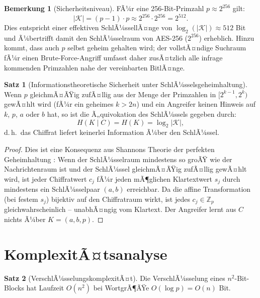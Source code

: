 ﻿\documentclass[a4paper,12pt]{scrreprt}
\theoremstyle{definition}
\newtheorem{bemerkung}{Bemerkung}[section]
\newtheorem{satz}{Satz}[section]
\begin{document}
\begin{bemerkung}[Sicherheitsniveau]
	FÃ¼r eine 256-Bit-Primzahl $p \approx 2^{256}$ gilt:
	\[
	|\mathcal{K}| = (p-1) \cdot p \approx 2^{256} \cdot 2^{256} = 2^{512}.
	\]
	Dies entspricht einer effektiven SchlÃ¼ssellÃ¤nge von $\log_2(|\mathcal{K}|) \approx 512$ Bit und Ã¼bertrifft damit den SchlÃ¼sselraum von AES-256 ($2^{256}$) erheblich. Hinzu kommt, dass auch $p$ selbst geheim gehalten wird; der vollstÃ¤ndige Suchraum fÃ¼r einen Brute-Force-Angriff umfasst daher zusÃ¤tzlich alle infrage kommenden Primzahlen nahe der vereinbarten BitlÃ¤nge.
\end{bemerkung}

\begin{satz}[Informationstheoretische Sicherheit unter SchlÃ¼sselsgeheimhaltung]
	\label{satz:infotheorie}
	Wenn $p$ gleichmÃ¤ÃŸig zufÃ¤llig aus der Menge der Primzahlen in $[2^{k-1}, 2^k)$ gewÃ¤hlt wird (fÃ¼r ein geheimes $k > 2n$) und ein Angreifer keinen Hinweis auf $k$, $p$, $a$ oder $b$ hat, so ist die Ã„quivokation des SchlÃ¼ssels gegeben durch:
	\[
	H(K \mid C) = H(K) = \log_2 |\mathcal{K}|,
	\]
	d.\,h.\ das Chiffrat liefert keinerlei Information Ã¼ber den SchlÃ¼ssel.
\end{satz}

\begin{proof}
	Dies ist eine Konsequenz aus Shannons Theorie der perfekten Geheimhaltung \cite{Sha49}: Wenn der SchlÃ¼sselraum mindestens so groÃŸ wie der Nachrichtenraum ist und der SchlÃ¼ssel gleichmÃ¤ÃŸig zufÃ¤llig gewÃ¤hlt wird, ist jeder Chiffratwert $c_j$ fÃ¼r jeden mÃ¶glichen Klartextwert $s_j$ durch mindestens ein SchlÃ¼sselpaar $(a, b)$ erreichbar. Da die affine Transformation (bei festem $s_j$) bijektiv auf den Chiffratraum wirkt, ist jedes $c_j \in \mathbb{Z}_p$ gleichwahrscheinlich -- unabhÃ¤ngig vom Klartext. Der Angreifer lernt aus $C$ nichts Ã¼ber $K = (a, b, p)$.
\end{proof}

\section{KomplexitÃ¤tsanalyse}

\begin{satz}[VerschlÃ¼sselungskomplexitÃ¤t]
	\label{satz:enc-kompl}
	Die VerschlÃ¼sselung eines $n^2$-Bit-Blocks hat Laufzeit $O(n^2)$ bei WortgrÃ¶ÃŸe $O(\log p) = O(n)$ Bit.
\end{satz}
\end{document}
